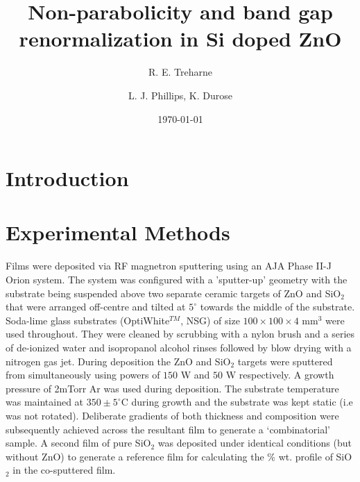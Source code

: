 \documentclass[aps,prl,5p,showpacs,showkeys,linenumbers, twocolumn]{revtex4-1}
\begin{document}
\title{Non-parabolicity and band gap renormalization in Si doped ZnO}
\author{R. E. Treharne}
\author{L. J. Phillips, K. Durose}
\date{\today}
\begin{abstract}
\end{abstract}
\maketitle
\section{Introduction}



\section{Experimental Methods}

Films were deposited via RF magnetron sputtering using an AJA Phase II-J Orion system. The system was configured with a 'sputter-up' geometry with the substrate being suspended above two separate ceramic targets of ZnO and SiO$_2$ that were arranged off-centre and tilted at $5^{\circ}$ towards the middle of the substrate.  Soda-lime glass substrates (OptiWhite$^{TM}$, NSG) of size $100\times100\times4$ mm$^{3}$ were used throughout. They were cleaned by scrubbing with a nylon brush and a series of de-ionized water and isopropanol alcohol rinses followed by blow drying with a nitrogen gas jet. During deposition the ZnO and SiO$_2$ targets were sputtered from simultaneously using powers of $150$ W and $50$ W respectively. A growth pressure of 2mTorr Ar was used during deposition. The substrate temperature was maintained at $350\pm5^{\circ}$C during growth and the substrate was kept static (i.e was not rotated). Deliberate gradients of both thickness and composition were subsequently achieved across the resultant film to generate a `combinatorial' sample. A second film of pure SiO$_{2}$ was deposited under identical conditions (but without ZnO) to generate a reference film for calculating the \% wt. profile of SiO$_{2}$ in the co-sputtered film.
\end{document}
